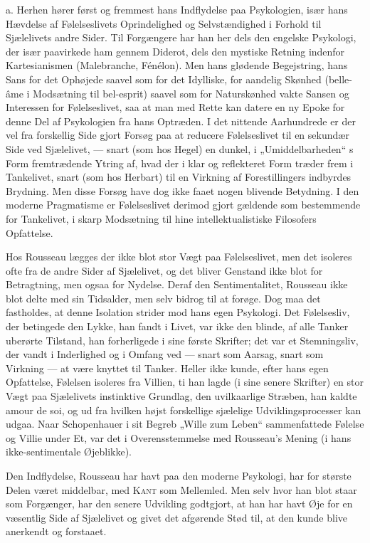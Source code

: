 \documentclass[12pt,a4paper,openany]{book}
\newcommand{\opage}[1]{\marginnote{\footnotesize\textit{[#1]}}}
\begin{document}
a. Herhen hører først og fremmest hans Indflydelse paa
Psykologien, især hans Hævdelse af Følelseslivets Oprindelighed
og Selvstændighed i Forhold til Sjælelivets andre Sider. Til
Forgængere har han her dels den engelske Psykologi, der især
paavirkede ham gennem Diderot, dels den mystiske Retning
\setcounter{footnote}{0}%
\opage{131}indenfor Kartesianismen (Malebranche, Fénélon). Men hans glødende
Begejstring, hans Sans for det Ophøjede saavel som for
det Idylliske, for aandelig Skønhed (belle-âme i Modsætning til
bel-esprit) saavel som for Naturskønhed vakte Sansen og Interessen
for Følelseslivet, saa at man med Rette kan datere en ny
Epoke for denne Del af Psykologien fra hans Optræden. I det
nittende Aarhundrede er der vel fra forskellig Side gjort Forsøg
paa at reducere Følelseslivet til en sekundær Side ved Sjælelivet,
--- snart (som hos Hegel) en dunkel, i „Umiddelbarheden“ s
Form fremtrædende Ytring af, hvad der i klar og reflekteret
Form træder frem i Tankelivet, snart (som hos Herbart) til en
Virkning af Forestillingers indbyrdes Brydning. Men disse Forsøg
have dog ikke faaet nogen blivende Betydning. I den moderne
Pragmatisme er Følelseslivet derimod gjort gældende som
bestemmende for Tankelivet, i skarp Modsætning til hine intellektualistiske
Filosofers Opfattelse.

Hos Rousseau lægges der ikke blot stor Vægt paa Følelseslivet,
men det isoleres ofte fra de andre Sider af Sjælelivet, og
det bliver Genstand ikke blot for Betragtning, men ogsaa for
Nydelse. Deraf den Sentimentalitet, Rousseau ikke blot delte
med sin Tidsalder, men selv bidrog til at forøge. Dog maa det
fastholdes, at denne Isolation strider mod hans egen Psykologi.
Det Følelsesliv, der betingede den Lykke, han fandt i Livet, var
ikke den blinde, af alle Tanker uberørte Tilstand, han forherligede
i sine første Skrifter; det var et Stemningsliv, der vandt
i Inderlighed og i Omfang ved --- snart som Aarsag, snart som
Virkning --- at være knyttet til Tanker. Heller ikke kunde, efter
hans egen Opfattelse, Følelsen isoleres fra Villien, ti han lagde
(i sine senere Skrifter) en stor Vægt paa Sjælelivets instinktive
Grundlag, den uvilkaarlige Stræben, han kaldte amour de soi,
og ud fra hvilken højst forskellige sjælelige Udviklingsprocesser
kan udgaa. Naar Schopenhauer i sit Begreb „Wille zum Leben“
sammenfattede Følelse og Villie under Et, var det i Overensstemmelse
med Rousseau’s Mening (i hans ikke-sentimentale
Øjeblikke).

Den Indflydelse, Rousseau har havt paa den moderne Psykologi,
har for største Delen været middelbar, med \textsc{Kant} som
\setcounter{footnote}{0}%
\opage{132}Mellemled. Men selv hvor han blot staar som Forgænger, har
den senere Udvikling godtgjort, at han har havt Øje for en
væsentlig Side af Sjælelivet og givet det afgørende Stød til, at
den kunde blive anerkendt og forstaaet.
\end{document}

